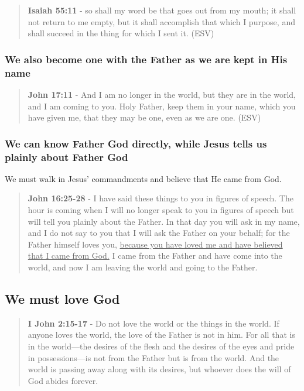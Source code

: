 \documentclass[11pt]{article}
\begin{document}
\begin{quote}
\textbf{Isaiah 55:11} - so shall my word be that goes out from my mouth; it shall not return to me empty, but it shall accomplish that which I purpose, and shall succeed in the thing for which I sent it. (ESV)
\end{quote}

\subsubsection{We also become one with the Father as we are kept in His name}
\label{sec:orgaf4d4da}

\begin{quote}
\textbf{John 17:11} - And I am no longer in the world, but they are in the world, and I am coming to you. Holy Father, keep them in your name, which you have given me, that they may be one, even as we are one. (ESV)
\end{quote}

\subsubsection{We can know Father God directly, while Jesus tells us plainly about Father God}
\label{sec:orgb91dece}
We must walk in Jesus' commandments and believe that He came from God.

\begin{quote}
\textbf{John 16:25-28} - I have said these things to you in figures of speech. The hour is coming when I will no longer speak to you in figures of speech but will tell you plainly about the Father. In that day you will ask in my name, and I do not say to you that I will ask the Father on your behalf; for the Father himself loves you, \uline{because you have loved me and have believed that I came from God.} I came from the Father and have come into the world, and now I am leaving the world and going to the Father.
\end{quote}

\subsection{We must love God}
\label{sec:org946f413}
\begin{quote}
\textbf{I John 2:15-17} - Do not love the world or the things in the world. If anyone loves the world, the love of the Father is not in him. For all that is in the world—the desires of the flesh and the desires of the eyes and pride in possessions—is not from the Father but is from the world. And the world is passing away along with its desires, but whoever does the will of God abides forever.
\end{quote}
\end{document}
